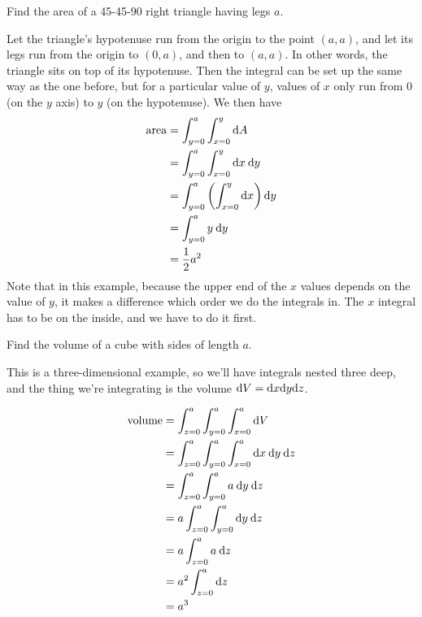 \begin{eg}
\egquestion Find the area of a 45-45-90 right triangle having legs $a$.

\eganswer Let the triangle's hypotenuse run from the origin to the point $(a,a)$,
and let its legs run from the origin to $(0,a)$, and then to $(a,a)$. In other
words, the triangle sits on top of its hypotenuse. Then the integral can be set
up the same way as the one before, but for a particular value of $y$, values of
$x$ only run from 0 (on the $y$ axis) to $y$ (on the hypotenuse). We then have
\begin{align*}
  \text{area} &= \int_{y=0}^a \int_{x=0}^y \textup{d} A \\
              &= \int_{y=0}^a \int_{x=0}^y \textup{d} x \:\textup{d} y \\
              &= \int_{y=0}^a \left(\int_{x=0}^y \textup{d} x\right) \textup{d} y \\
              &= \int_{y=0}^a y \:\textup{d} y \\
              &= \frac{1}{2}a^2
\end{align*}
Note that in this example, because the upper end of the $x$ values depends
on the value of $y$, it makes a difference which order we do the integrals
in. The $x$ integral has to be on the inside, and we have to do it first.
\end{eg}

\begin{eg}
\egquestion Find the volume of a cube with sides of length $a$.

\eganswer This is a three-dimensional example, so we'll have integrals
nested three deep, and the thing we're integrating is the volume
$\textup{d} V = \textup{d} x \textup{d} y \textup{d} z$.

\begin{align*}
  \text{volume} &= \int_{z=0}^a \int_{y=0}^a \int_{x=0}^a \textup{d} V \\
              &= \int_{z=0}^a \int_{y=0}^a \int_{x=0}^a \textup{d} x \: \textup{d} y \: \textup{d} z \\
              &= \int_{z=0}^a \int_{y=0}^a a \: \textup{d} y \: \textup{d} z \\
              &= a \int_{z=0}^a \int_{y=0}^a \textup{d} y \: \textup{d} z \\
              &= a \int_{z=0}^a a \: \textup{d} z \\
              &= a^2 \int_{z=0}^a \textup{d} z \\
              &= a^3
\end{align*}
\end{eg}

